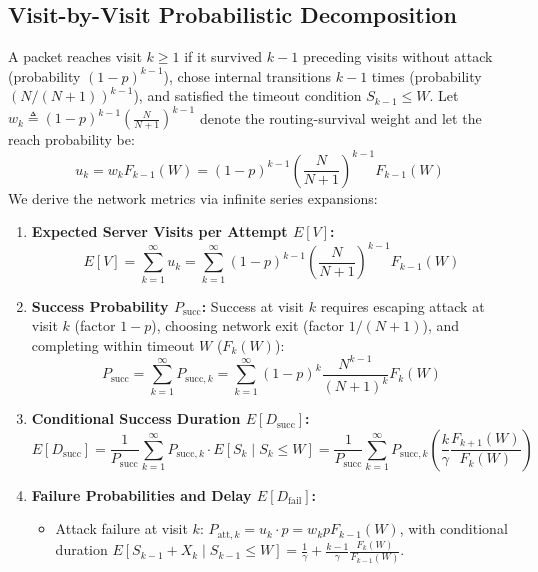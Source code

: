 \documentclass[12pt,onecolumn]{article}
\begin{document}
\subsection{Visit-by-Visit Probabilistic Decomposition}
A packet reaches visit $k \ge 1$ if it survived $k-1$ preceding visits without attack (probability $(1-p)^{k-1}$), chose internal transitions $k-1$ times (probability $(N/(N+1))^{k-1}$), and satisfied the timeout condition $S_{k-1} \le W$. Let $w_k \triangleq (1 - p)^{k-1}\left(\frac{N}{N+1}\right)^{k-1}$ denote the routing-survival weight and let the reach probability be:
\begin{equation}
u_k = w_k F_{k-1}(W) = (1 - p)^{k-1} \left(\frac{N}{N+1}\right)^{k-1} F_{k-1}(W)
\end{equation}
We derive the network metrics via infinite series expansions:
\begin{enumerate}
    \item \textbf{Expected Server Visits per Attempt $E[V]$:}
    \begin{equation}
    E[V] = \sum_{k=1}^\infty u_k = \sum_{k=1}^\infty (1 - p)^{k-1} \left(\frac{N}{N+1}\right)^{k-1} F_{k-1}(W)
    \end{equation}
    \item \textbf{Success Probability $P_{\text{succ}}$:} Success at visit $k$ requires escaping attack at visit $k$ (factor $1-p$), choosing network exit (factor $1/(N+1)$), and completing within timeout $W$ ($F_k(W)$):
    \begin{equation}
    P_{\text{succ}} = \sum_{k=1}^\infty P_{\text{succ}, k} = \sum_{k=1}^\infty (1 - p)^k \frac{N^{k-1}}{(N+1)^k} F_k(W)
    \end{equation}
    \item \textbf{Conditional Success Duration $E[D_{\text{succ}}]$:}
    \begin{equation}
    E[D_{\text{succ}}] = \frac{1}{P_{\text{succ}}} \sum_{k=1}^\infty P_{\text{succ}, k} \cdot E[S_k \mid S_k \le W] = \frac{1}{P_{\text{succ}}} \sum_{k=1}^\infty P_{\text{succ}, k} \left(\frac{k}{\gamma} \frac{F_{k+1}(W)}{F_k(W)}\right)
    \end{equation}
    \item \textbf{Failure Probabilities and Delay $E[D_{\text{fail}}]$:}
    \begin{itemize}
        \item Attack failure at visit $k$: $P_{\text{att}, k} = u_k \cdot p = w_k p F_{k-1}(W)$, with conditional duration $E[S_{k-1} + X_k \mid S_{k-1} \le W] = \frac{1}{\gamma} + \frac{k-1}{\gamma}\frac{F_k(W)}{F_{k-1}(W)}$.

\end{itemize}
\end{enumerate}
\end{document}
